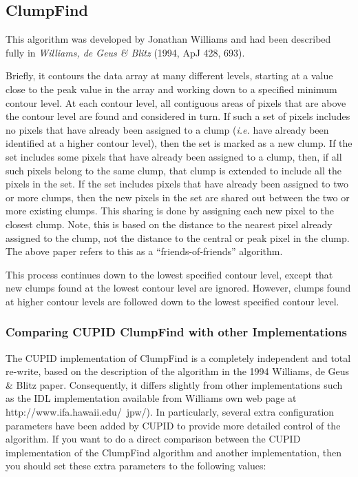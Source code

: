\documentclass[twoside,11pt]{article}
\newcommand{\htmladdnormallink}[2]{#1}
\newcommand{\xlabel}[1]{}
\renewcommand{\_}{\texttt{\symbol{95}}}
\begin{document}
\subsection{\xlabel{clumpfind}ClumpFind}
This algorithm was developed by Jonathan Williams and had been described
fully in \emph{Williams, de Geus \& Blitz} (1994, ApJ 428, 693).

Briefly, it contours the data array at many different levels, starting at
a value close to the peak value in the array and working down to a
specified minimum contour level. At each contour level, all contiguous
areas of pixels that are above the contour level are found and considered
in turn. If such a set of pixels includes no pixels that have already
been assigned to a clump (\emph{i.e.} have already been identified at a
higher contour level), then the set is marked as a new clump. If the set
includes some pixels that have already been assigned to a clump, then, if
all such pixels belong to the same clump, that clump is extended to
include all the pixels in the set. If the set includes pixels that have
already been assigned to two or more clumps, then the new pixels in the
set are shared out between the two or more existing clumps. This sharing
is done by assigning each new pixel to the closest clump. Note, this is
based on the distance to the nearest pixel already assigned to the clump,
not the distance to the central or peak pixel in the clump. The above
paper refers to this as a ``friends-of-friends'' algorithm.

This process continues down to the lowest specified contour level, except
that new clumps found at the lowest contour level are ignored. However,
clumps found at higher contour levels are followed down to the lowest
specified contour level.

\subsubsection{Comparing CUPID ClumpFind with other Implementations}
The CUPID implementation of ClumpFind is a completely independent
and total re-write, based on the description of the algorithm in the 1994
Williams, de Geus \& Blitz paper. Consequently, it differs slightly from
other implementations such as the IDL implementation available from
Williams own web page at \htmladdnormallink{http://www.ifa.hawaii.edu/~jpw/}
{{\tt http://www.ifa.hawaii.edu/~jpw/}}). In particularly, several extra
configuration parameters have been added by CUPID to provide more
detailed control of the algorithm. If you want to do a direct comparison
between the CUPID implementation of the ClumpFind algorithm and another
implementation, then you should set these extra parameters to the
following values:
\end{document}
